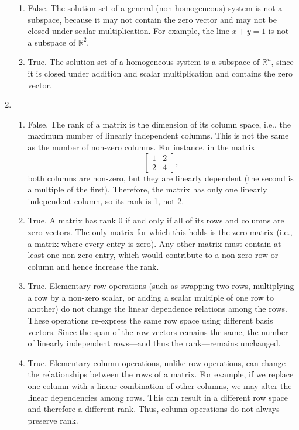 \documentclass[12pt]{article}
\begin{document}
\begin{enumerate}
\begin{enumerate}
    \item False. The solution set of a general (non-homogeneous) system is not a subspace, because it may not contain the zero vector and may not be closed under scalar multiplication. For example, the line \( x + y = 1 \) is not a subspace of \( \mathbb{R}^2 \).

    \item True. The solution set of a homogeneous system is a subspace of \( \mathbb{R}^n \), since it is closed under addition and scalar multiplication and contains the zero vector.
\end{enumerate}

\item 
\begin{enumerate}
    \item False. The rank of a matrix is the dimension of its column space, i.e., the maximum number of linearly independent columns. This is not the same as the number of non-zero columns. For instance, in the matrix
    \[
    \begin{bmatrix}
    1 & 2 \\
    2 & 4
    \end{bmatrix},
    \]
    both columns are non-zero, but they are linearly dependent (the second is a multiple of the first). Therefore, the matrix has only one linearly independent column, so its rank is 1, not 2.

    \item True. A matrix has rank 0 if and only if all of its rows and columns are zero vectors. The only matrix for which this holds is the zero matrix (i.e., a matrix where every entry is zero). Any other matrix must contain at least one non-zero entry, which would contribute to a non-zero row or column and hence increase the rank.

    \item True. Elementary row operations (such as swapping two rows, multiplying a row by a non-zero scalar, or adding a scalar multiple of one row to another) do not change the linear dependence relations among the rows. These operations re-express the same row space using different basis vectors. Since the span of the row vectors remains the same, the number of linearly independent rows—and thus the rank—remains unchanged.

    \item True. Elementary column operations, unlike row operations, can change the relationships between the rows of a matrix. For example, if we replace one column with a linear combination of other columns, we may alter the linear dependencies among rows. This can result in a different row space and therefore a different rank. Thus, column operations do not always preserve rank.


\end{enumerate}
\end{enumerate}
\end{document}
